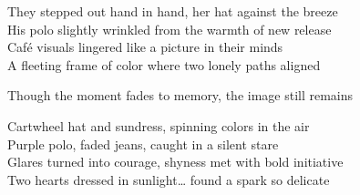 \begin{lyrics}
They stepped out hand in hand, her hat against the breeze\\
His polo slightly wrinkled from the warmth of new release\\
Café visuals lingered like a picture in their minds\\
A fleeting frame of color where two lonely paths aligned

Though the moment fades to memory, the image still remains

Cartwheel hat and sundress, spinning colors in the air\\
Purple polo, faded jeans, caught in a silent stare\\
Glares turned into courage, shyness met with bold initiative\\
Two hearts dressed in sunlight… found a spark so delicate

\end{lyrics}


